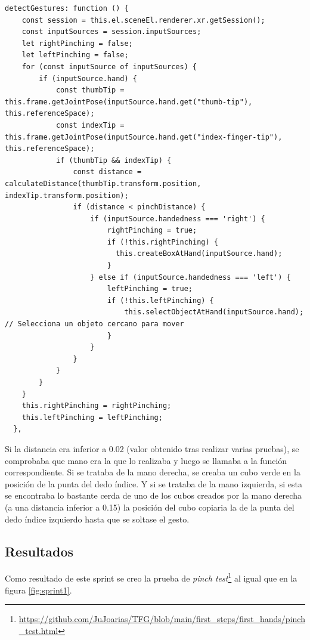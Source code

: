 \documentclass[a4paper, 12pt]{book}
\begin{document}
\begin{lstlisting}[caption=Función detectGestures, captionpos=b, label=lst:firstdetectGesture]
  detectGestures: function () {
    const session = this.el.sceneEl.renderer.xr.getSession();
    const inputSources = session.inputSources;
    let rightPinching = false;
    let leftPinching = false;
    for (const inputSource of inputSources) {
        if (inputSource.hand) {
            const thumbTip = this.frame.getJointPose(inputSource.hand.get("thumb-tip"), this.referenceSpace);
            const indexTip = this.frame.getJointPose(inputSource.hand.get("index-finger-tip"), this.referenceSpace);
            if (thumbTip && indexTip) {
                const distance = calculateDistance(thumbTip.transform.position, indexTip.transform.position);
                if (distance < pinchDistance) {
                    if (inputSource.handedness === 'right') {
                        rightPinching = true;
                        if (!this.rightPinching) {
                          this.createBoxAtHand(inputSource.hand);  
                        }
                    } else if (inputSource.handedness === 'left') {
                        leftPinching = true;
                        if (!this.leftPinching) {
                            this.selectObjectAtHand(inputSource.hand); // Selecciona un objeto cercano para mover
                        }
                    }
                }
            }
        }
    }
    this.rightPinching = rightPinching;
    this.leftPinching = leftPinching;
  },
\end{lstlisting}

Si la distancia era inferior a 0.02 (valor obtenido tras realizar varias pruebas), se comprobaba que mano era la que lo realizaba y luego se llamaba a la función correspondiente. 
Si se trataba de la mano derecha, se creaba un cubo verde en la posición de la punta del dedo índice. Y si se trataba de la mano izquierda, si esta se encontraba lo bastante cerda de uno de los cubos creados por la mano derecha (a una distancia inferior a 0.15) la posición del cubo copiaria la de la punta del dedo índice izquierdo hasta que se soltase el gesto.


\subsection{Resultados}
\label{subsec:resultados1}

Como resultado de este sprint se creo la prueba de \textit{pinch test}\footnote{\url{https://github.com/JuJoarias/TFG/blob/main/first_steps/first_hands/pinch_test.html}} al igual que en la figura \ref{fig:sprint1}.
\end{document}
